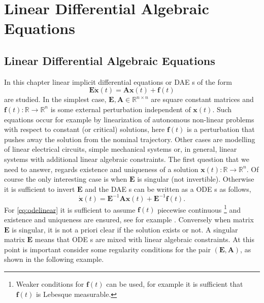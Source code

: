 %
%

\chapter{Linear Differential Algebraic Equations}
	\label{ch:linearDAE}
	\section{Linear Differential Algebraic Equations}
		In this chapter linear implicit differential equations or DAE s of the form
		\textbf{}
		\begin{equation}
			\label{eq:daelinear}
			\bm{E}\dot{\bm{x}}(t) = \bm{A}\bm{x}(t)+\bm{f}(t)
		\end{equation}
		are studied. In the simplest case, $\bm{E},\bm{A}\in\mathbb{R}^{n\times n}$ are square constant matrices and $\bm{f}(t):\mathbb{R}\rightarrow\mathbb{R}^{n}$ is some external perturbation independent of $\bm{x}(t)$. Such equations occur for example by linearization of autonomous non-linear problems with respect to constant (or critical) solutions, here $\bm{f}(t)$ is a perturbation that pushes away the solution from the nominal trajectory. Other cases are modelling of  linear electrical circuits, simple mechanical systems or, in general, linear systems with additional linear algebraic  constraints.
		The first question that we need to answer, regards existence and uniqueness of a solution $\bm{x}(t):\mathbb{R}\rightarrow\mathbb{R}^{n}$.
		Of course the only interesting case is when $\bm{E}$ is singular (not invertible). Otherwise it is sufficient to invert $\bm{E}$ and the DAE s can be written as a ODE s as follows,
		\begin{equation}
			\label{eq:odelinear}
			\dot{\bm{x}}(t) = \bm{E}^{-1}\bm{A}\bm{x}(t)+\bm{E}^{-1}\bm{f}(t).
		\end{equation}
		For \cref{eq:odelinear} it is sufficient to assume $\bm{f}(t)$ piecewise continuous \footnote{Weaker conditions for $\bm{f}(t)$ can be used, for example it is sufficient that $\bm{f}(t)$ is Lebesque measurable.} and existence and uniqueness are ensured, see for example \cite{coddington1955theory}.  
		Conversely when matrix $\bm{E}$ is singular, it is not a priori clear if the solution exists or not. A singular matrix $\bm{E}$ means that ODE s are mixed with linear algebraic constraints. At this point is important consider some regularity conditions for the pair $(\bm{E},\bm{A})$, as shown in the following example. 
